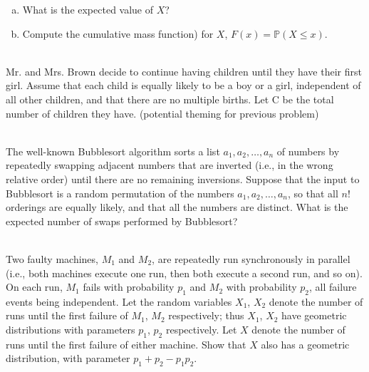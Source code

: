 \documentclass[]{article}
\newif\ifsolutions
\renewcommand{\answer}[1]{{\color{mydarkblue}\textbf{Solution:}#1}}
\begin{document}
\begin{qunlist}
\begin{enumerate}[a)]
\qpart
\item What is the expected value of $X$?


\qpart
\item Compute the cumulative mass function) for $X$, $F(x) = \mathbb{P}(X \leq x)$.

\ifsolutions{ \answer{ 
	We can use the formula for a finite geometric series to find $F(x)$,
	\[ F(x) = p \sum_{y=0}^x (1-p)^y = p \cdot \frac{1 - (1-p)^x}{1 - (1-p)} = 1 - (1-p)^x. \]
}}\fi

\end{enumerate}

 \\
Mr. and Mrs. Brown decide to continue having children until they have their first girl.
Assume that each child is equally likely to be a boy or a girl, independent of all other children, and that there are no multiple births.
Let C be the total number of children they have.
(potential theming for previous problem)

 \\
The well-known Bubblesort algorithm sorts a list $a_1, a_2, \ldots, a_n$ of numbers by repeatedly swapping adjacent numbers that are inverted (i.e., in the wrong relative order) until there are no remaining inversions. Suppose that the input to Bubblesort is a random permutation of the numbers $a_1, a_2, \ldots, a_n$, so that all $n!$ orderings are equally likely, and that all the numbers are distinct. What is the expected number of swaps performed by Bubblesort?

 \\
Two faulty machines, $M_1$ and $M_2$, are repeatedly run synchronously in parallel (i.e., both machines execute one run, then both execute a second run, and so on). On each run, $M_1$ fails with probability $p_1$ and $M_2$ with probability $p_2$, all failure events being independent. Let the random variables $X_1$, $X_2$ denote the number of runs until the first failure of $M_1$, $M_2$ respectively; thus $X_1$, $X_2$ have geometric distributions with parameters $p_1$, $p_2$ respectively.
Let $X$ denote the number of runs until the first failure of either machine. Show that $X$ also has a geometric distribution, with parameter $p_1 + p_2 − p_1p_2.$


\end{qunlist}
\end{document}
